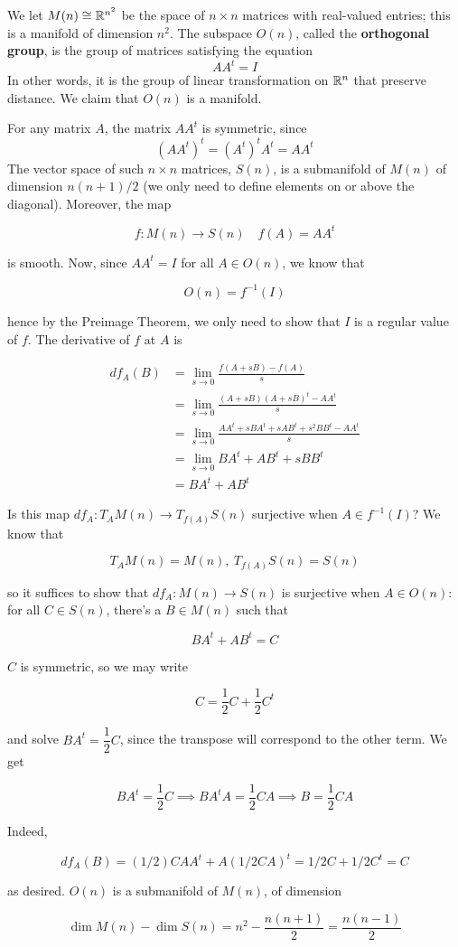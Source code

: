\begin{example}
    We let $M(n) \cong \mathbb{R}^{n^2}$ be the space of $n \times n$ matrices with real-valued entries; this is a manifold of dimension $n^2$. The subspace $O(n)$, called the \textbf{orthogonal group}, is the group of matrices satisfying the equation
    \[AA^t = I\]
    In other words, it is the group of linear transformation on $\mathbb{R}^n$ that preserve distance. We claim that $O(n)$ is a manifold. 

    For any matrix $A$, the matrix $AA^t$ is symmetric, since 
    \[(AA^t)^t = (A^t)^tA^t = AA^t\]
    The vector space of such $n \times n$ matrices, $S(n)$, is a submanifold of $M(n)$ of dimension $n(n+1)/2$ (we only need to define elements on or above the diagonal). Moreover, the map

    \[f: M(n) \to S(n) \quad f(A) = AA^t\]

    is smooth. Now, since $AA^t = I$ for all $A \in O(n)$, we know that 

    \[O(n) = f^{-1}(I)\]

    hence by the Preimage Theorem, we only need to show that $I$ is a regular value of $f$. The derivative of $f$ at $A$ is 

    \begin{align*}
        df_A(B) & = \lim_{s\to 0}\frac{f(A + sB) - f(A)}{s} \\
        & = \lim_{s\to 0} \frac{(A + sB)(A + sB)^t - AA^t}{s} \\
        & = \lim_{s\to 0} \frac{AA^t + sBA^t + sAB^t + s^2BB^t - AA^t}{s} \\
        & = \lim_{s\to 0} BA^t + AB^t + sBB^t \\
        & = BA^t + AB^t
    \end{align*}

    Is this map $df_A: T_AM(n) \to T_{f(A)}S(n)$ surjective when $A \in f^{-1}(I)$? We know that 

    \[T_AM(n) = M(n), \ T_{f(A)}S(n) = S(n)\]

    so it suffices to show that $df_A: M(n) \to S(n)$ is surjective when $A \in O(n)$: for all $C \in S(n)$, there's a $B \in M(n)$ such that 

    \[BA^t + AB^t = C\]

    $C$ is symmetric, so we may write 

    \[C = \frac{1}{2}C + \frac{1}{2}C^t\]

    and solve $BA^t = \dfrac{1}{2}C$, since the transpose will correspond to the other term. We get 

    \[BA^t = \frac{1}{2}C \implies BA^tA = \frac{1}{2}CA \implies B = \frac{1}{2}CA\]

    Indeed, 

    \[df_A(B) = (1/2)CAA^t + A(1/2 CA)^t = 1/2C + 1/2C^t = C\]

    as desired. $O(n)$ is a submanifold of $M(n)$, of dimension
    
    \[\dim M(n) - \dim S(n) = n^2 - \frac{n(n+1)}{2} = \frac{n(n-1)}{2}\]
\end{example}

